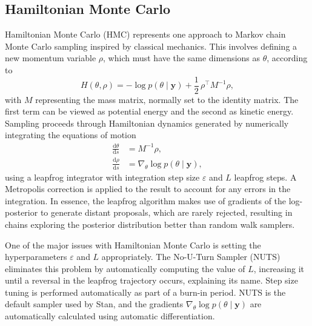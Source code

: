 \subsection{Hamiltonian Monte Carlo}
Hamiltonian Monte Carlo (HMC) represents one approach to Markov chain Monte Carlo 
sampling inspired by classical mechanics. This involves defining a new momentum 
variable $\rho$, which must have the same dimensions as $\theta$, according to
%
\begin{equation}
    H(\theta, \rho) = -\log p(\theta \mid \mathbf{y}) + \frac{1}{2}\, \rho^{\top} M^{-1} \rho,
\end{equation}
%
with $M$ representing the mass matrix, normally set to the identity matrix. The 
first term can be viewed as potential energy and the second as kinetic energy. 
Sampling proceeds through Hamiltonian dynamics generated by numerically integrating 
the equations of motion
%
\begin{align}
    \frac{\mathrm{d}\theta}{\mathrm{d}s} &= M^{-1} \rho, \\[4pt]
    \frac{\mathrm{d}\rho}{\mathrm{d}s} &= \nabla_{\!\theta} \log p(\theta \mid \mathbf{y}),
\end{align}
%
using a leapfrog integrator with integration step size $\varepsilon$ and $L$ 
leapfrog steps. A Metropolis correction is applied to the result to account for 
any errors in the integration. In essence, the leapfrog algorithm makes use of 
gradients of the log-posterior to generate distant proposals, which are rarely 
rejected, resulting in chains exploring the posterior distribution better than 
random walk samplers.

One of the major issues with Hamiltonian Monte Carlo is setting the hyperparameters 
$\varepsilon$ and $L$ appropriately. The No-U-Turn Sampler (NUTS) eliminates this 
problem by automatically computing the value of $L$, increasing it until a reversal 
in the leapfrog trajectory occurs, explaining its name. Step size tuning is 
performed automatically as part of a burn-in period. NUTS is the default sampler 
used by Stan, and the gradients $\nabla_{\!\theta} \log p(\theta \mid \mathbf{y})$ 
are automatically calculated using automatic differentiation.